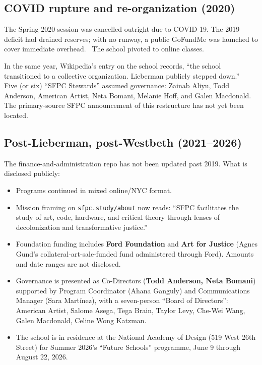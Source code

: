 \documentclass[10pt,letterpaper,twocolumn]{article}
\begin{document}
\subsection{COVID rupture and re-organization (2020)}

The Spring 2020 session was cancelled outright due to COVID-19. The 2019 deficit had drained reserves; with no runway, a public GoFundMe was launched to cover immediate overhead.~\citep{sfpcgofundme} The school pivoted to online classes.

In the same year, Wikipedia's entry on the school records, ``the school transitioned to a collective organization. Lieberman publicly stepped down.''~\citep{wikipediasfpc} Five (or six) ``SFPC Stewards'' assumed governance: Zainab Aliyu, Todd Anderson, American Artist, Neta Bomani, Melanie Hoff, and Galen Macdonald. The primary-source SFPC announcement of this restructure has not yet been located.

\subsection{Post-Lieberman, post-Westbeth (2021--2026)}

The finance-and-administration repo has not been updated past 2019. What is disclosed publicly:

\begin{itemize}
\item Programs continued in mixed online/NYC format.
\item Mission framing on \texttt{sfpc.study/about} now reads: ``SFPC facilitates the study of art, code, hardware, and critical theory through lenses of decolonization and transformative justice.''
\item Foundation funding includes \textbf{Ford Foundation} and \textbf{Art for Justice} (Agnes Gund's collateral-art-sale-funded fund administered through Ford). Amounts and date ranges are not disclosed.
\item Governance is presented as Co-Directors (\textbf{Todd Anderson, Neta Bomani}) supported by Program Coordinator (Ahana Ganguly) and Communications Manager (Sara Mart\'inez), with a seven-person ``Board of Directors'': American Artist, Salome Asega, Tega Brain, Taylor Levy, Che-Wei Wang, Galen Macdonald, Celine Wong Katzman.
\item The school is in residence at the National Academy of Design (519 West 26th Street) for Summer 2026's ``Future Schools'' programme, June 9 through August 22, 2026.
\end{itemize}
\end{document}

